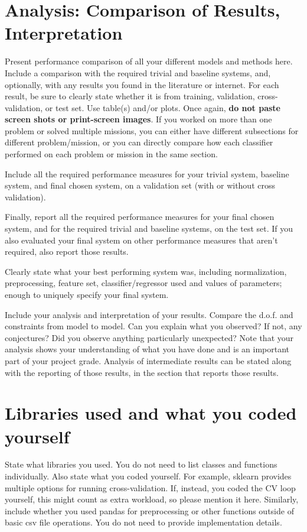 \documentclass[singlecolumn]{article}
\begin{document}
\section{Analysis: Comparison of Results, Interpretation}
Present performance comparison of all your different models and methods here.  Include a comparison with the required trivial and baseline systems, and, optionally, with any results you found in the literature or internet.  For each result, be sure to clearly state whether it is from training, validation, cross-validation, or test set.  Use table(s) and/or plots. Once again, \textbf{do not paste screen shots or print-screen images}.  If you worked on more than one problem or solved multiple missions, you can either have different subsections for different problem/mission, or you can directly compare how each classifier performed on each problem or mission in the same section.
 
Include all the required performance measures for your trivial system, baseline system, and final chosen system, on a validation set (with or without cross validation).  

Finally, report all the required performance measures for your final chosen system, and for the required trivial and baseline systems, on the test set. If you also evaluated your final system on other performance measures that aren't required, also report those results.

Clearly state what your best performing system was, including normalization, preprocessing, feature set, classifier/regressor used and values of parameters; enough to uniquely specify your final system.    

Include your analysis and interpretation of your results.  Compare the d.o.f. and constraints from model to model.  Can you explain what you observed?  If not, any conjectures?   Did you observe anything particularly unexpected?   Note that your analysis shows your understanding of what you have done and is an important part of your project grade.  Analysis of intermediate results can be stated along with the reporting of those results, in the section that reports those results.


\section{Libraries used and what you coded yourself}
State what libraries you used.  You do not need to list classes and functions individually. Also state what you coded yourself. For example, sklearn provides multiple options for running cross-validation. If, instead, you coded the CV loop yourself, this might count as extra workload, so please mention it here. Similarly, include whether you used pandas for preprocessing or other functions outside of basic csv file operations.  You do not need to provide implementation details.
\end{document}
